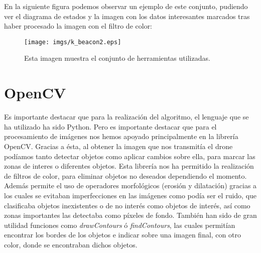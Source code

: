 En la siguiente figura podemos observar un ejemplo de este conjunto, pudiendo ver el diagrama de estados y la imagen con los datos interesantes marcados tras haber procesado la imagen con el filtro de color:

\begin{figure}[ht]
	\centering
		\texttt{[image: imgs/k\_beacon2.eps]}
		\caption{Esta imagen muestra el conjunto de herramientas utilizadas.}
	\label{fig:Herramientas}
\end{figure}

\section{OpenCV}
\hspace{1 cm}  Es importante destacar que para la realizaci\'on del algoritmo, el lenguaje que se ha utilizado ha sido Python. Pero es importante destacar que para el procesamiento de im\'agenes nos hemos apoyado principalmente en la librer\'ia OpenCV. Gracias a \'esta, al obtener la imagen que nos transmit\'ia el drone pod\'iamos tanto detectar objetos como aplicar cambios sobre ella, para marcar las zonas de interes o diferentes objetos.
\hspace{1 cm} Esta librer\'ia nos ha permitido la realizaci\'on de filtros de color, para eliminar objetos no deseados dependiendo el momento. Adem\'as permite el uso de operadores morfol\'ogicos (erosi\'on y dilataci\'on) gracias a los cuales se evitaban imperfecciones en las im\'agenes como pod\'ia ser el ruido, que clasificaba objetos inexistentes o de no inter\'es como objetos de inter\'es, as\'i como zonas importantes las detectaba como p\'ixeles de fondo. Tambi\'en han sido de gran utilidad funciones como \textit{drawContours} \'o \textit{findContours}, las cuales permit\'ian encontrar los bordes de los objetos e indicar sobre una imagen final, con otro color, donde se encontraban dichos objetos. 
